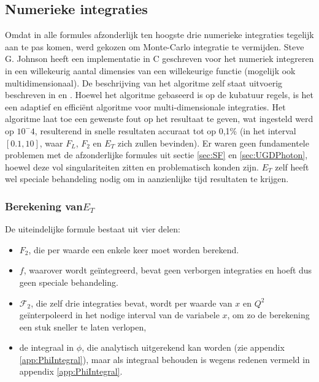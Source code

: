 \documentclass[a4paper,11pt]{article}
\numberwithin{equation}{section} %
\begin{document}
  \subsection{Numerieke integraties}
Omdat in alle formules afzonderlijk ten hoogste drie numerieke integraties tegelijk aan te pas komen, werd gekozen om Monte-Carlo integratie te vermijden.
Steve G. Johnson heeft een implementatie in C geschreven voor het numeriek integreren in een willekeurig aantal dimensies van een willekeurige functie (mogelijk ook multidimensionaal).
De beschrijving van het algoritme zelf staat uitvoerig beschreven in \cite{Genz} en \cite{Berntsen}.
Hoewel het algoritme gebaseerd is op de kubatuur regels, is het een adaptief en efficiënt algoritme voor multi-dimensionale integraties.
Het algoritme laat toe een gewenste fout op het resultaat te geven, wat ingesteld werd op $10^-4$, resulterend in snelle resultaten accuraat tot op 0,1\% (in het interval $[0.1,10]$, waar $F_L$, $F_2$ en $E_T$ zich zullen bevinden).
Er waren geen fundamentele problemen met de afzonderlijke formules uit sectie \ref{sec:SF} en \ref{sec:UGDPhoton}, hoewel deze vol singulariteiten zitten en problematisch konden zijn.
$E_T$ zelf heeft wel speciale behandeling nodig om in aanzienlijke tijd resultaten te krijgen.

  \subsubsection{Berekening van$E_T$}
De uiteindelijke formule bestaat uit vier delen:
\begin{itemize}
  \item $F_2$, die per waarde een enkele keer moet worden berekend.
  \item $f$, waarover wordt geïntegreerd, bevat geen verborgen integraties en hoeft dus geen speciale behandeling.
  \item $\mathcal{F}_2$, die zelf drie integraties bevat, wordt per waarde van $x$ en $Q^2$ geïnterpoleerd in het nodige interval van de variabele $x$, om zo de berekening een stuk sneller te laten verlopen,
  \item de integraal in $\phi$, die analytisch uitgerekend kan worden (zie appendix \ref{app:PhiIntegral}), maar als integraal behouden is wegens redenen vermeld in appendix \ref{app:PhiIntegral}.
\end{itemize}
\end{document}
